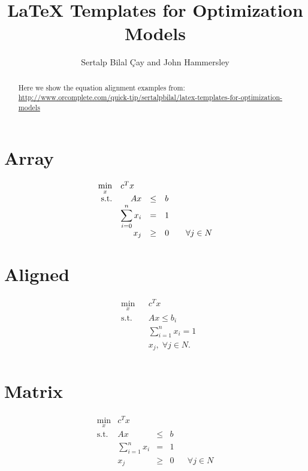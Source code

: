 \documentclass[a4paper]{article}
\title{LaTeX Templates for Optimization Models}
\author{Sertalp Bilal {\c{C}}ay and John Hammersley}
\begin{document}
\maketitle

\begin{abstract}
Here we show the equation alignment examples from:\\ \url{http://www.orcomplete.com/quick-tip/sertalpbilal/latex-templates-for-optimization-models}
\end{abstract}

\section{Array} %

\begin{equation}
\begin{array}{rrclcl}
\displaystyle \min_{x} & \multicolumn{3}{l}{c^T x} \\
\textrm{s.t.} & A x & \leq & b \\
&\displaystyle \sum_{i=0}^{n} x_i & = & 1 \\
& x_j & \geq & 0 & & \forall j \in N \\
\end{array}
\end{equation}

\section{Aligned} %

\begin{equation}
\begin{aligned}
& \underset{x}{\text{min}}
& & c^T x \\
& \text{s.t.} & &  Ax \leq b_i \\
& & &  \sum_{i=1}^{n} x_i =1 \\
& & &  x_j, \; \forall j \in N. \\
\end{aligned}
\end{equation}

\section{Matrix} %

\begin{equation}
\begin{matrix}
\displaystyle \min_x & c^T x  \\
\textrm{s.t.} & A x & \leq & b  \\
& \displaystyle \sum_{i=1}^{n} x_i & = & 1  \\
& x_j & \geq & 0 & & \forall j \in N
\end{matrix}
\end{equation}
\end{document}
